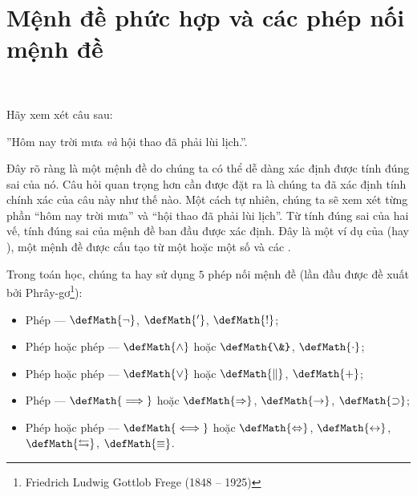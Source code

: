 \section{Mệnh đề phức hợp và các phép nối mệnh đề}

\ %

Hãy xem xét câu sau:
\begin{center}
   ''Hôm nay trời mưa \emph{và} hội thao đã phải lùi lịch.''.
\end{center}
Đây rõ ràng là một mệnh đề do chúng ta có thể dễ dàng xác định được tính đúng sai của nó. Câu hỏi quan trọng hơn cần được đặt ra là chúng ta đã xác định tính chính xác của câu này như thế nào. Một cách tự nhiên, chúng ta sẽ xem xét từng phần ``hôm nay trời mưa'' và ``hội thao đã phải lùi lịch''. Từ tính đúng sai của hai vế, tính đúng sai của mệnh đề ban đầu được xác định. Đây là một ví dụ của  (hay ), một mệnh đề được cấu tạo từ một hoặc một số  và các .

Trong toán học, chúng ta hay sử dụng $5$ phép nối mệnh đề (lần đầu được đề xuất bởi Phrây-gơ\footnote{Friedrich Ludwig Gottlob Frege (1848 -- 1925)}):
\begin{itemize}
   \item Phép  --- $\defMath{\neg}$, $\defMath{'}$, $\defMath{!}$;
   \item Phép  hoặc phép  --- $\defMath{\land}$ hoặc $\defMath{\&}$, $\defMath{\cdot}$;
   \item Phép  hoặc phép  --- $\defMath{\lor}$ hoặc $\defMath{\parallel}$, $\defMath{+}$;
   \item Phép  --- $\defMath{\implies}$ hoặc $\defMath{\Rightarrow}$, $\defMath{\rightarrow}$, $\defMath{\supset}$;
   \item Phép  hoặc phép  --- $\defMath{\iff}$ hoặc $\defMath{\Leftrightarrow}$, $\defMath{\leftrightarrow}$, $\defMath{\leftrightarrows}$, $\defMath{\equiv}$.
\end{itemize}

